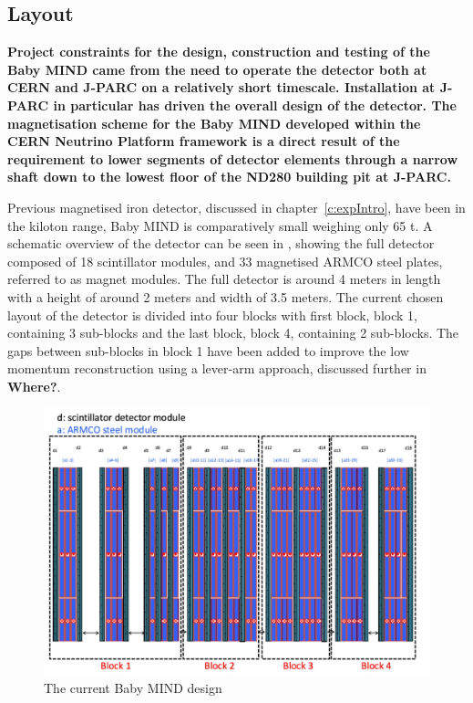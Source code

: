 
\subsection{Layout}
\textbf{Project constraints for the design, construction and testing of the Baby MIND came from the need to operate the detector both at CERN and J-PARC on a relatively short timescale. Installation at J-PARC in particular has driven the overall design of the detector. The magnetisation scheme for the Baby MIND developed within the CERN Neutrino Platform framework is a direct result of the requirement to lower segments of detector elements through a narrow shaft down to the lowest floor of the ND280 building pit at J-PARC. }

Previous magnetised iron detector, discussed in chapter~\ref{c:expIntro}, have been in the kiloton range, Baby MIND is comparatively small weighing only 65 t. A schematic overview of the detector can be seen in , showing the full detector composed of 18 scintillator modules, and 33 magnetised ARMCO steel plates, referred to as magnet modules. The full detector is around 4 meters in length with a height of around 2 meters and width of 3.5 meters. The current chosen layout of the detector is divided into four blocks with first block, block 1, containing 3 sub-blocks and the last block, block 4, containing 2 sub-blocks. The gaps between sub-blocks in block 1 have been added to improve the low momentum reconstruction using a lever-arm approach, discussed further in \textbf{Where?}.


\begin{figure}[h!]
\centering
\includegraphics[width=\textwidth]{figures/MINDschematic.jpeg}
\caption{The current Baby MIND design}
\label{fig:design}
\end{figure}

